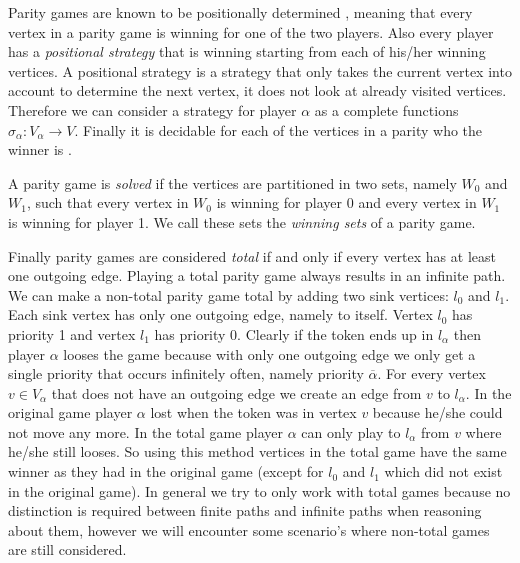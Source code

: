 Parity games are known to be positionally determined \cite{Bradfield2018}, meaning that every vertex in a parity game is winning for one of the two players. Also every player has a \textit{positional strategy} that is winning starting from each of his/her winning vertices. A positional strategy is a strategy that only takes the current vertex into account to determine the next vertex, it does not look at already visited vertices. Therefore we can consider a strategy for player $\alpha$ as a complete functions $\sigma_\alpha : V_\alpha \rightarrow V$. Finally it is decidable for each of the vertices in a parity who the winner is \cite{Bradfield2018}.

A parity game is \textit{solved} if the vertices are partitioned in two sets, namely $W_0$ and $W_1$, such that every vertex in $W_0$ is winning for player 0 and every vertex in $W_1$ is winning for player 1. We call these sets the \textit{winning sets} of a parity game.

Finally parity games are considered \textit{total} if and only if every vertex has at least one outgoing edge. Playing a total parity game always results in an infinite path. We can make a non-total parity game total by adding two sink vertices: $l_0$ and $l_1$. Each sink vertex has only one outgoing edge, namely to itself. Vertex $l_0$ has priority 1 and vertex $l_1$ has priority 0. Clearly if the token ends up in $l_\alpha$ then player $\alpha$ looses the game because with only one outgoing edge we only get a single priority that occurs infinitely often, namely priority $\overline{\alpha}$. For every vertex $v \in V_\alpha$ that does not have an outgoing edge we create an edge from $v$ to $l_\alpha$. In the original game player $\alpha$ lost when the token was in vertex $v$ because he/she could not move any more. In the total game player $\alpha$ can only play to $l_\alpha$ from $v$ where he/she still looses. So using this method vertices in the total game have the same winner as they had in the original game (except for $l_0$ and $l_1$ which did not exist in the original game). In general we try to only work with total games because no distinction is required between finite paths and infinite paths when reasoning about them, however we will encounter some scenario's where non-total games are still considered.

